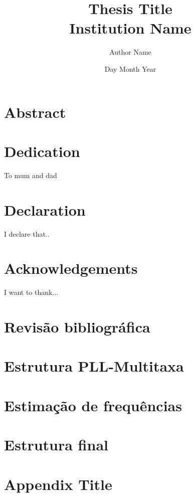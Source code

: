 \documentclass[12pt,twoside]{report}
\begin{document}
\title{
	{Thesis Title}\\
	{\large Institution Name}\\
}
\author{Author Name}
\date{Day Month Year}

\chapter*{Abstract}
\cite{einstein}

\chapter*{Dedication}
To mum and dad

\chapter*{Declaration}
I declare that..

\chapter*{Acknowledgements}
I want to thank...

\tableofcontents
\listoffigures 
\listoftables

\chapter{Revisão bibliográfica}


\chapter{Estrutura PLL-Multitaxa}


\chapter{Estimação de frequências}


\chapter{Estrutura final}


\appendix
\chapter{Appendix Title}


\printbibliography
\end{document}
